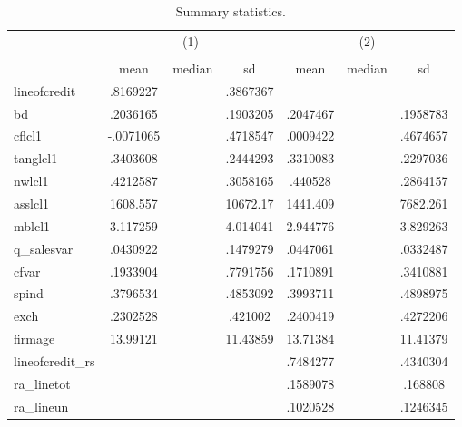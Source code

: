 \begin{table}[htbp]\centering
\def\sym#1{\ifmmode^{#1}\else\(^{#1}\)\fi}
\caption{Summary statistics.}
\begin{tabular}{l*{2}{ccc}}
\hline\hline
            &\multicolumn{3}{c}{(1)}               &\multicolumn{3}{c}{(2)}               \\
            &\multicolumn{3}{c}{}                  &\multicolumn{3}{c}{}                  \\
            &        mean&      median&          sd&        mean&      median&          sd\\
\hline
lineofcredit&    .8169227&            &    .3867367&            &            &            \\
bd          &    .2036165&            &    .1903205&    .2047467&            &    .1958783\\
cflcl1      &   -.0071065&            &    .4718547&    .0009422&            &    .4674657\\
tanglcl1    &    .3403608&            &    .2444293&    .3310083&            &    .2297036\\
nwlcl1      &    .4212587&            &    .3058165&     .440528&            &    .2864157\\
asslcl1     &    1608.557&            &    10672.17&    1441.409&            &    7682.261\\
mblcl1      &    3.117259&            &    4.014041&    2.944776&            &    3.829263\\
q\_salesvar  &    .0430922&            &    .1479279&    .0447061&            &    .0332487\\
cfvar       &    .1933904&            &    .7791756&    .1710891&            &    .3410881\\
spind       &    .3796534&            &    .4853092&    .3993711&            &    .4898975\\
exch        &    .2302528&            &     .421002&    .2400419&            &    .4272206\\
firmage     &    13.99121&            &    11.43859&    13.71384&            &    11.41379\\
lineofcredit\_rs&            &            &            &    .7484277&            &    .4340304\\
ra\_linetot  &            &            &            &    .1589078&            &     .168808\\
ra\_lineun   &            &            &            &    .1020528&            &    .1246345\\

\end{tabular}
\end{table}
